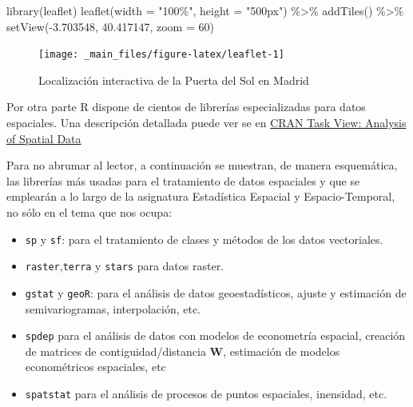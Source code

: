 \documentclass[
]{book}
\newenvironment{Shaded}{\begin{snugshade}}{\end{snugshade}}
\newcommand{\AttributeTok}[1]{\textcolor[rgb]{0.77,0.63,0.00}{#1}}
\newcommand{\DecValTok}[1]{\textcolor[rgb]{0.00,0.00,0.81}{#1}}
\newcommand{\FloatTok}[1]{\textcolor[rgb]{0.00,0.00,0.81}{#1}}
\newcommand{\FunctionTok}[1]{\textcolor[rgb]{0.00,0.00,0.00}{#1}}
\newcommand{\NormalTok}[1]{#1}
\newcommand{\SpecialCharTok}[1]{\textcolor[rgb]{0.00,0.00,0.00}{#1}}
\newcommand{\StringTok}[1]{\textcolor[rgb]{0.31,0.60,0.02}{#1}}
\begin{document}
\begin{Shaded}
\begin{Highlighting}[]
\FunctionTok{library}\NormalTok{(leaflet)}
\FunctionTok{leaflet}\NormalTok{(}\AttributeTok{width =} \StringTok{"100\%"}\NormalTok{, }\AttributeTok{height =} \StringTok{"500px"}\NormalTok{) }\SpecialCharTok{\%\textgreater{}\%}
  \FunctionTok{addTiles}\NormalTok{() }\SpecialCharTok{\%\textgreater{}\%}
  \FunctionTok{setView}\NormalTok{(}\SpecialCharTok{{-}}\FloatTok{3.703548}\NormalTok{, }\FloatTok{40.417147}\NormalTok{, }\AttributeTok{zoom =} \DecValTok{60}\NormalTok{)}
\end{Highlighting}
\end{Shaded}

\begin{figure}

{\centering \texttt{[image: \_main\_files/figure-latex/leaflet-1]} 

}

\caption{Localización interactiva de la Puerta del Sol en Madrid}\label{fig:leaflet}
\end{figure}

Por otra parte R dispone de cientos de librerías especializadas para datos
espaciales. Una descripción detallada puede ver se en \href{https://cran.r-project.org/web/views/Spatial.html}{CRAN Task View: Analysis
of Spatial Data}

Para no abrumar al lector, a continuación se muestran, de manera esquemática,
las librerías más usadas para el tratamiento de datos espaciales y que se
emplearán a lo largo de la asignatura Estadística Espacial y Espacio-Temporal,
no sólo en el tema que nos ocupa:

\begin{itemize}
\item
  \texttt{sp} y \texttt{sf}: para el tratamiento de clases y métodos de los datos
  vectoriales.
\item
  \texttt{raster},\texttt{terra} y \texttt{stars} para datos raster.
\item
  \texttt{gstat} y \texttt{geoR}: para el análisis de datos geoestadísticos, ajuste y
  estimación de semivariogramas, interpolación, etc.
\item
  \texttt{spdep} para el análisis de datos con modelos de econometría espacial,
  creación de matrices de contiguidad/distancia \textbf{W}, estimación de modelos
  econométricos espaciales, etc
\item
  \texttt{spatstat} para el análisis de procesos de puntos espaciales, inensidad,
  etc.
\end{itemize}
\end{document}
